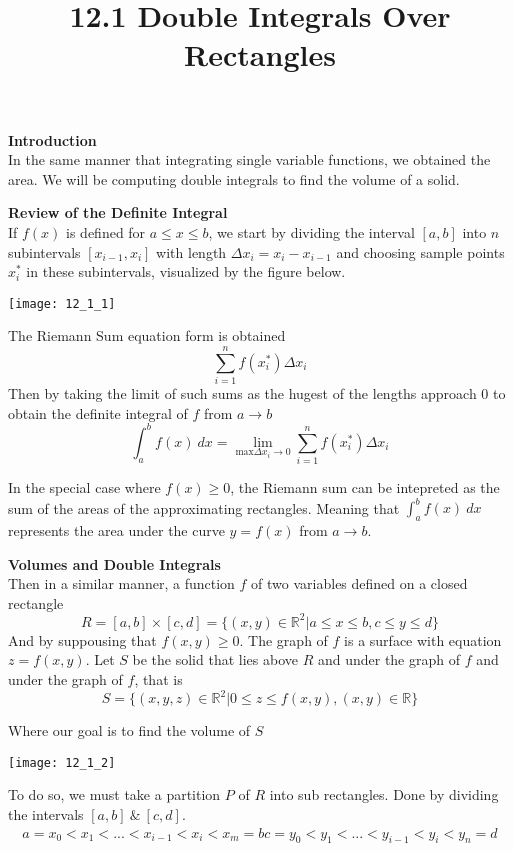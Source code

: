 \documentclass{article}
\title{12.1 Double Integrals Over Rectangles}
\begin{document}
  \maketitle
  \textbf{Introduction}\\
  In the same manner that integrating single variable functions, we obtained the area. We will be computing double integrals to find the volume of a solid.

  \textbf{Review of the Definite Integral}\\
  If $ f(x) $ is defined for $ a \le x\le b $, we start by dividing the interval $ [a,b] $ into $ n $ subintervals $ [x_{i-1},x_{i} ] $ with length $ \Delta x_{i}=x_{i}-x_{i-1} $ and choosing sample points $ x_{i}^{*} $ in these subintervals, visualized by the figure below.
  \begin{center}
    \texttt{[image: 12\_1\_1]}
  \end{center}

  The Riemann Sum equation form is obtained
  \[
   \sum^{n}_{i=1} f(x_{i}^{*}) \Delta x_{i} 
  \]
  Then by taking the limit of such sums as the hugest of the lengths approach 0 to obtain the definite integral of $ f $ from $ a \to b $
  \[
    \int^{b}_{a} f(x)~dx=\lim_{\text{max}\Delta x_{i} \to 0} \sum^{n}_{i=1} f(x_{i}^{*})\Delta x_{i}
  \]

  In the special case where $ f(x) \ge 0$, the Riemann sum can be intepreted as the sum of the areas of the approximating rectangles. Meaning that $ \int^{b}_{a} f(x)~dx $ represents the area under the curve $ y=f(x) $ from $ a\to b $. 

  \textbf{Volumes and Double Integrals}\\
  Then in a similar manner, a function $ f $ of two variables defined on a closed rectangle
  \[
    R=[a,b] \times [c,d] = \{ (x,y) \in \mathbb{R}^{2} | a \le x \le b,c \le y \le d \}
  \]
  And by suppousing that $ f(x,y) \ge 0 $. The graph of $ f $ is a surface with equation $ z=f(x,y) $. Let $ S $ be the solid that lies above $ R $ and  under the graph of $ f $ and under the graph of $ f $, that is
  \[
    S=\{ (x,y,z) \in \mathbb{R}^{2} | 0 \le z \le f(x,y), (x,y) \in \mathbb{R} \}
  \]
  
  Where our goal is to find the volume of $ S $
  \begin{center}
    \texttt{[image: 12\_1\_2]}
  \end{center}

  To do so, we must take a partition $ P $ of $ R $ into sub rectangles. Done by dividing the intervals $ [a,b] ~\&~ [c,d] $.
  \[
    \begin{gathered}
    a = x_0 < x_1 < ... < x_{i-1} < x_i < x_{m} = b
    c = y_0 < y_1 < ... < y_{i-1} < y_i < y_{n} = d
    \end{gathered}
  \]
\end{document}
